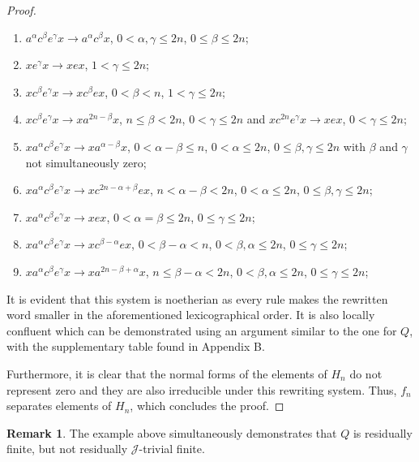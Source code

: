 \documentclass{article}
\theoremstyle{definition}
\newtheorem{remark}{Remark}
\def\J{\mathcal J}
\begin{document}
\begin{proof}
\begin{enumerate}
\item $ a^\alpha c^\beta e^\gamma x  \rightarrow a^\alpha c^\beta x $, $0<\alpha, \gamma  \le 2n$, $0 \le \beta \le 2n$;

\item $x e^\gamma x \rightarrow xex$, $1< \gamma  \le 2n$;

\item $x c^\beta e^\gamma x \rightarrow x c^{\beta} e x$, $0< \beta < n$, $1 <\gamma \le 2n$;
\item $x c^\beta e^\gamma x \rightarrow x a^{2n-\beta} x$, $n\le \beta < 2n$, $0 <\gamma \le 2n$ and $x c^{2n} e^\gamma x \rightarrow x e x$, $0 <\gamma \le 2n$;

\item $x a^\alpha c^\beta e^\gamma x \rightarrow x a^{\alpha - \beta} x$, $0<\alpha - \beta \le n$, $0<  \alpha  \le 2n$, $0\le \beta,\gamma \le 2n$ with $\beta$ and $\gamma$ not simultaneously zero;
\item $x a^\alpha c^\beta e^\gamma x \rightarrow x c^{2n-\alpha+\beta} e x$, $n<\alpha - \beta < 2n$, $0< \alpha  \le 2n$, $0\le \beta, \gamma \le 2n$;

\item $x a^\alpha c^\beta e^\gamma x\rightarrow x e x$, $0 <\alpha = \beta \le 2n$, $0\le \gamma \le 2n$;
\item $x a^\alpha c^\beta e^\gamma x\rightarrow x c^{\beta - \alpha} e x$, $0 < \beta - \alpha < n$, $0< \beta, \alpha  \le 2n$, $0\le \gamma \le 2n$;
\item $x a^\alpha c^\beta e^\gamma x\rightarrow x a^{2n - \beta + \alpha} x$, $n \le \beta - \alpha < 2n$, $0< \beta, \alpha  \le 2n$, $0\le \gamma \le 2n$;
\end{enumerate}

It is evident that this system is noetherian as every rule makes the rewritten word smaller in the aforementioned lexicographical order. It is also locally confluent which can be demonstrated using an argument similar to the one for $Q$, with the supplementary table found in Appendix B.

Furthermore, it is clear that the normal forms of the elements of $H_n$ do not represent zero and they are also irreducible under this rewriting system. Thus, $f_n$ separates elements of $H_n$, which concludes the proof.
\end{proof}

\begin{remark}
The example above simultaneously demonstrates that $Q$ is residually finite, but not residually $\J$-trivial finite.
\end{remark}
\end{document}
